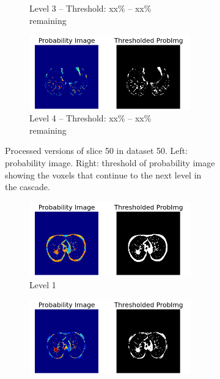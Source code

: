 \begin{figure}[p]
\begin{center}
\begin{subfigure}[b]{0.45\linewidth}
\begin{subfigure}[b]{\linewidth}
			\caption{Level 3 -- Threshold: xx\% -- xx\% remaining}
		\end{subfigure}
		\begin{subfigure}[b]{\linewidth}
			\includegraphics[width=\linewidth]{img/cascades/D50L4S50.png}
			\caption{Level 4 -- Threshold: xx\% -- xx\% remaining}
		\end{subfigure}
	  \caption{Processed versions of slice 50 in dataset 50. Left: probability
	  image. Right: threshold of probability image showing the voxels that continue
	  to the next level in the cascade.}
	  \label{fig:d50s50}
  \end{subfigure}
  \begin{subfigure}[b]{0.45\linewidth}
  		\begin{subfigure}[b]{\linewidth}
			\includegraphics[width=\linewidth]{img/cascades/D50L1S95.png}
			\caption{Level 1}
		\end{subfigure}
		\begin{subfigure}[b]{\linewidth}
			\includegraphics[width=\linewidth]{img/cascades/D50L2S95.png}

\end{subfigure}
\end{subfigure}
\end{center}
\end{figure}
